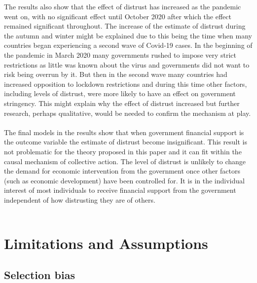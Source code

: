 \documentclass[
  11pt,
]{article}
\begin{document}
The results also show that the effect of distrust has increased as the pandemic went on, with no significant effect until October 2020 after which the effect remained significant throughout. The increase of the estimate of distrust during the autumn and winter might be explained due to this being the time when many countries began experiencing a second wave of Covid-19 cases. In the beginning of the pandemic in March 2020 many governments rushed to impose very strict restrictions as little was known about the virus and governments did not want to risk being overrun by it. But then in the second wave many countries had increased opposition to lockdown restrictions and during this time other factors, including levels of distrust, were more likely to have an effect on government stringency. This might explain why the effect of distrust increased but further research, perhaps qualitative, would be needed to confirm the mechanism at play.\\
~\\
The final models in the results show that when government financial support is the outcome variable the estimate of distrust become insignificant. This result is not problematic for the theory proposed in this paper and it can fit within the causal mechanism of collective action. The level of distrust is unlikely to change the demand for economic intervention from the government once other factors (such as economic development) have been controlled for. It is in the individual interest of most individuals to receive financial support from the government independent of how distrusting they are of others.\\
~\\

\hypertarget{limitations-and-assumptions}{%
\section{Limitations and Assumptions}\label{limitations-and-assumptions}}

\hypertarget{selection-bias}{%
\subsection{Selection bias}\label{selection-bias}}
\end{document}
